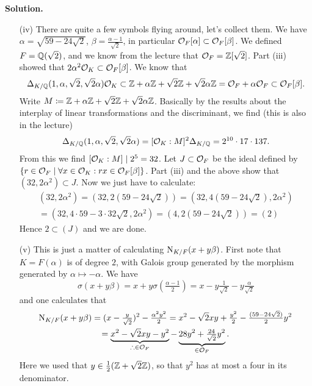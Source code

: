 \documentclass[a4paper,11pt]{article}
\begin{document}
\textbf{Solution.}
\begin{enumerate}[labelindent=0pt, wide]
    \item[(iv)]  There are quite a few symbols flying around, let's collect them.
        We have $\alpha = \sqrt{59 - 24\sqrt 2}$, $\beta =
        \frac{\alpha-1}{\sqrt 2}$, in particular $\mathcal{O}_F[\alpha] \subset
        \mathcal{O}_F[\beta]$.
        We defined $F = \mathbb{Q}(\sqrt 2)$, and we know from the lecture that
        $\mathcal{O}_F = \mathbb{Z}[\sqrt 2]$. Part (iii) showed that 
        $2 \alpha^2 \mathcal{O}_K \subset \mathcal{O}_F[\beta]$.
        We know that
        $$\Delta_{K/\mathbb{Q}}(1, \alpha, \sqrt 2, \sqrt 2 \alpha) \mathcal{O}_K \subset \mathbb{Z} +
        \alpha \mathbb{Z} + \sqrt 2 \mathbb{Z} + \sqrt 2 \alpha \mathbb{Z} = \mathcal{O}_F + \alpha \mathcal{O}_F
        \subset \mathcal{O}_F[\beta].$$
        Write $M \coloneqq \mathbb{Z} + \alpha \mathbb{Z} + \sqrt 2 \mathbb{Z} + \sqrt 2 \alpha \mathbb{Z}$.
        Basically by the results about the interplay of linear transformations
        and the discriminant, we find (this is also in the lecture)
        \begin{equation*}
            \Delta_{K/\mathbb{Q}}(1, \alpha, \sqrt 2, \sqrt 2 \alpha) 
            = [\mathcal{O}_K:M]^2 \Delta_{K/\mathbb{Q}} = 2^{10} \cdot 17 \cdot 137.
        \end{equation*}
        From this we find $[\mathcal{O}_K:M] \mid 2^5=32$. 
        Let $J \subset \mathcal{O}_F$ be the ideal defined by $\{r \in \mathcal{O}_F
        \mid \forall x \in \mathcal{O}_K: rx \in \mathcal{O}_F[\beta]\}$. Part (iii) and 
        the above show that $(32, 2\alpha^2) \subset J$. Now we just have to
        calculate:
        \begin{multline*}
            (32, 2\alpha^2) = (32, 2 (59 - 24 \sqrt 2)) = (32, 4(59 - 24 \sqrt 2),
            2\alpha^2) \\ = (32, 4\cdot 59 - 3 \cdot 32\sqrt 2, 2 \alpha^2)  = 
            (4, 2(59 - 24 \sqrt 2)) = (2)
        \end{multline*}
        Hence $2 \subset (J)$ and we are done. 

    \item[(v)] This is just a matter of calculating $\operatorname{N}_{K/F}(x + y\beta)$.
        First note that $K = F(\alpha)$ is of degree $2$, with Galois group
        generated by the morphism generated by $\alpha \mapsto -\alpha$. 
        We have
        \begin{equation*}
            \sigma(x + y\beta) = x + y\sigma \left( \tfrac{\alpha-1}{2} \right)
            = x - y\tfrac{1}{\sqrt 2} - y\tfrac{\alpha}{\sqrt 2}
        \end{equation*}
        and one calculates that 
        \begin{multline*}
            \operatorname{N}_{K/F}(x+y\beta) = (x - \tfrac{y}{\sqrt 2})^2 - \tfrac{\alpha^2
            y^2}2 = x^2 - \sqrt 2 xy + \tfrac{y^2}2 - \tfrac{(59 - 24\sqrt 2)}2 y^2
            \\
            = \underbrace{x^2 - \sqrt 2 xy - y^2}_{\therefore \in \mathcal{O}_F} - 
            \underbrace{28y^2 + \tfrac{24}{\sqrt 2}y^2}_{\in \mathcal{O}_F}.
        \end{multline*}
        Here we used that $y \in \frac 12 (\mathbb{Z} + \sqrt 2 \mathbb{Z})$, so that 
        $y^2$ has at most a four in its denominator.


\end{enumerate}
\end{document}
